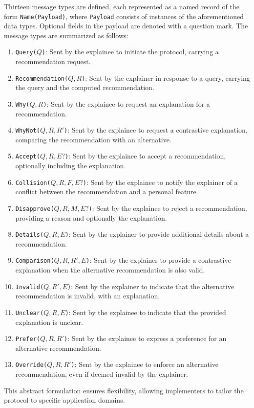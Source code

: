 %
Thirteen message types are defined, each represented as a named record of the form \texttt{Name(Payload)}, where \texttt{Payload} consists of instances of the aforementioned data types.
%
Optional fields in the payload are denoted with a question mark.
%
The message types are summarized as follows:
%
\begin{enumerate}
    \item \texttt{Query(\(Q\))}: Sent by the explainee to initiate the protocol, carrying a recommendation request.
    \item \texttt{Recommendation(\(Q, R\))}: Sent by the explainer in response to a query, carrying the query and the computed recommendation.
    \item \texttt{Why(\(Q, R\))}: Sent by the explainee to request an explanation for a recommendation.
    \item \texttt{WhyNot(\(Q, R, R'\))}: Sent by the explainee to request a contrastive explanation, comparing the recommendation with an alternative.
    \item \texttt{Accept(\(Q, R, E?\))}: Sent by the explainee to accept a recommendation, optionally including the explanation.
    \item \texttt{Collision(\(Q, R, F, E?\))}: Sent by the explainee to notify the explainer of a conflict between the recommendation and a personal feature.
    \item \texttt{Disapprove(\(Q, R, M, E?\))}: Sent by the explainee to reject a recommendation, providing a reason and optionally the explanation.
    \item \texttt{Details(\(Q, R, E\))}: Sent by the explainer to provide additional details about a recommendation.
    \item \texttt{Comparison(\(Q, R, R', E\))}: Sent by the explainer to provide a contrastive explanation when the alternative recommendation is also valid.
    \item \texttt{Invalid(\(Q, R', E\))}: Sent by the explainer to indicate that the alternative recommendation is invalid, with an explanation.
    \item \texttt{Unclear(\(Q, R, E\))}: Sent by the explainee to indicate that the provided explanation is unclear.
    \item \texttt{Prefer(\(Q, R, R'\))}: Sent by the explainee to express a preference for an alternative recommendation.
    \item \texttt{Override(\(Q, R, R'\))}: Sent by the explainee to enforce an alternative recommendation, even if deemed invalid by the explainer.
\end{enumerate}
%
This abstract formulation ensures flexibility, allowing implementers to tailor the protocol to specific application domains.

